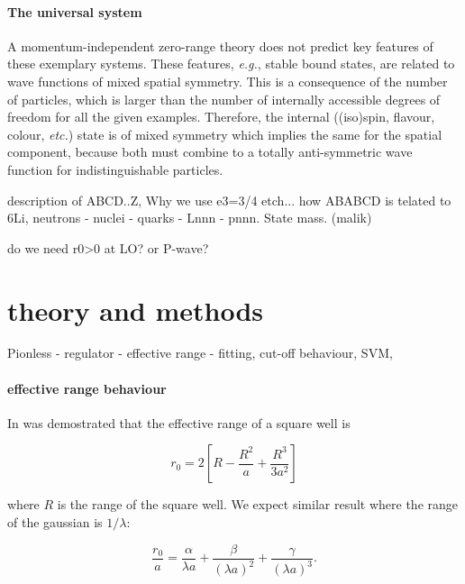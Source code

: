 \documentclass[aps,nofootinbib,prl,showpacs,twocolumn,groupedaddress,superscriptaddress]
{revtex4}
\newcommand{\eg}{\textit{e.g.}\;}
\newcommand{\etc}{\textit{etc.}\;}
\begin{document}
\paragraph{The universal system}
A momentum-independent zero-range theory does not predict key features of these exemplary systems.
These features, \eg, stable bound states,
are related to wave functions of mixed spatial symmetry.
This is a consequence of the number of particles,
which is larger than the number of internally accessible degrees of freedom for all the given examples.
Therefore, the internal ((iso)spin, flavour, colour, \etc)
state is of mixed symmetry which implies the same for the spatial component,
because both must combine to a totally anti-symmetric wave function for indistinguishable particles.

description of ABCD..Z, 
Why we use e3=3/4 etch... 
how ABABCD is telated to 6Li, 
neutrons - nuclei - quarks - Lnnn - pnnn.
State mass. (malik)


do we need r0>0 at LO?
or P-wave?

\section{theory and methods}
Pionless - regulator - effective range - fitting, 
cut-off behaviour, 
SVM, 

\paragraph{effective range behaviour}
In \cite{Phillips} was demostrated that the effective range of a square well is 

\begin{equation}
    r_0 = 2 [R-\frac{R^2}{a}+\frac{R^3}{3 a^2}]
\end{equation}

where $R$ is the range of the square well. We expect similar result where the range of the gaussian is $1/\lambda$:

\begin{equation}
    \frac{r_0}{a} = \frac{ \alpha}{\lambda a}+ \frac{\beta}{(\lambda a)^2}+ \frac{\gamma}{(\lambda a)^3}.
    \label{eq:philips_effr}
\end{equation}
\end{document}
